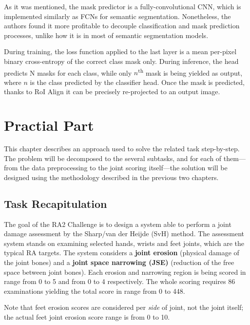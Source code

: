 \documentclass[thesis=B,english]{FITthesis}[2019/12/23]
\begin{document}
As it was mentioned, the mask predictor is a fully-convolutional CNN, which is implemented similarly as FCNs for semantic segmentation. Nonetheless, the authors found it more profitable to decouple classification and mask prediction processes, unlike how it is in most of semantic segmentation models.

During training, the loss function applied to the last layer is a mean per-pixel binary cross-entropy of the correct class mask only. During inference, the head predicts N masks for each class, while only $n$\textsuperscript{th} mask is being yielded as output, where $n$ is the class predicted by the classifier head. Once the mask is predicted, thanks to RoI Align it can be precisely re-projected to an output image.

\chapter{Practial Part}

This chapter describes an approach used to solve the related task step-by-step. The problem will be decomposed to the several subtasks, and for each of them---from the data preprocessing to the joint scoring itself---the solution will be designed using the methodology described in the previous two chapters.

\section{Task Recapitulation}

The goal of the RA2 Challenge\cite{synapse_ra2} is to design a system able to perform a joint damage assessment by the Sharp/van der Heijde (SvH) method. The assessment system stands on examining selected hands, wrists and feet joints, which are the typical RA targets. The system considers a \textbf{joint erosion} (physical damage of the joint bones) and a \textbf{joint space narrowing (JSE)} (reduction of the free space between joint bones). Each erosion and narrowing region is being scored in range from 0 to 5 and from 0 to 4 respectively. The whole scoring requires 86 examinations yielding the total score in range from 0 to 448.

Note that feet erosion scores are considered per \textit{side} of joint, not the joint itself; the actual feet joint erosion score range is from 0 to 10.
\end{document}
